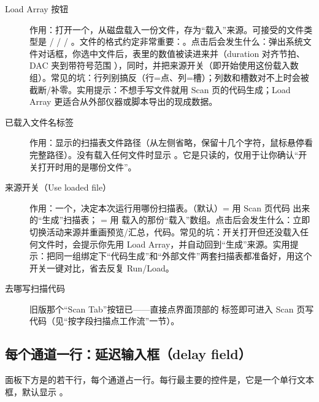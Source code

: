 \documentclass[11pt,oneside,openany]{book}
\begin{document}
\begin{description}
\item[Load Array 按钮] 作用：打开一个，从磁盘载入一份文件，存为“载入”来源。可接受的文件类型是  /  /  / 。文件的格式约定非常重要：。点击后会发生什么：弹出系统文件对话框，你选中文件后，表里的数值被读进来并（duration 对齐节拍、DAC 夹到带符号范围 ），同时，并把来源开关（即开始使用这份载入数组）。常见的坑：行列别搞反（行=点、列=槽）；列数和槽数对不上时会被截断/补零。实用提示：不想手写文件就用 Scan 页的代码生成；Load Array 更适合从外部仪器或脚本导出的现成数据。

\item[已载入文件名标签] 作用：显示的扫描表文件路径（从左侧省略，保留十几个字符，鼠标悬停看完整路径）。没有载入任何文件时显示 。它是只读的，仅用于让你确认“开关打开时用的是哪份文件”。

\item[来源开关（Use loaded file）] 作用：一个，决定本次运行用哪份扫描表。（默认）= 用 Scan 页代码  出来的“生成”扫描表； = 用  载入的那份“载入”数组。点击后会发生什么：立即切换活动来源并重画预览/汇总，代码。常见的坑：开关打开但还没载入任何文件时，会提示你先用 Load Array，并自动回到“生成”来源。实用提示：把同一组绑定下“代码生成”和“外部文件”两套扫描表都准备好，用这个开关一键对比，省去反复 Run/Load。

\item[去哪写扫描代码] 旧版那个“Scan Tab”按钮已——直接点界面顶部的  标签即可进入 Scan 页写代码（见“按字段扫描点工作流”一节）。
\end{description}

\subsection{每个通道一行：延迟输入框（delay field）}

面板下方是的若干行，每个通道占一行。每行最主要的控件是，它是一个单行文本框，默认显示 。
\end{document}
